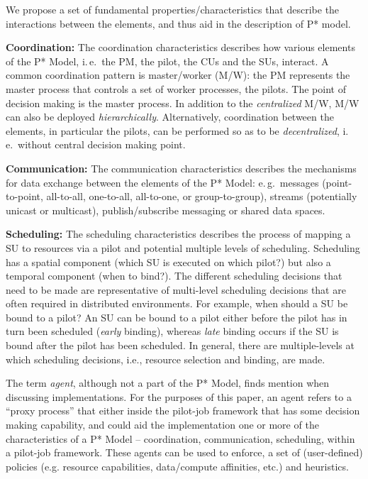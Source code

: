 \documentclass[conference,final]{IEEEtran}
\newcommand{\jhanote}[1]{ {\textcolor{red} { ***shantenu: #1 }}}
\newcommand{\alnote}[1]{ {\textcolor{blue} { ***andre: #1 }}}
\newcommand{\alnote}[1]{}
\newcommand{\jhanote}[1]{}
\newcommand{\cu}{CU}
\begin{document}
We propose a set of fundamental properties/characteristics that
describe the interactions between the elements, and thus aid in the
description of P* model.


\textbf{Coordination:} The coordination characteristics describes how
various elements of the P* Model, i.\,e.\ the PM, the pilot, the \cu s
and the SUs, interact. A common coordination pattern is master/worker
(M/W): the PM represents the master process that controls a set of
worker processes, the pilots. The point of decision making is the
master process. In addition to the \emph{centralized} M/W, M/W can
also be deployed \emph{hierarchically}.  Alternatively, coordination
between the elements, in particular the pilots, can be performed so as
to be \emph{decentralized}, i.\,e.\ without central decision making
point.

%

\textbf{Communication:} The communication characteristics describes the
mechanisms for data exchange between the elements of the P* Model:
e.\,g.\ messages (point-to-point, all-to-all, one-to-all, all-to-one,
or group-to-group), streams (potentially unicast or multicast),
publish/subscribe messaging or shared data spaces.
		
\textbf{Scheduling:} The scheduling characteristics describes the
process of mapping a SU to resources via a pilot and potential
multiple levels of scheduling. Scheduling has a spatial component
(which SU is executed on which pilot?) but also a temporal component
(when to bind?). The different scheduling decisions that need to be
made are representative of multi-level scheduling decisions that are
often required in distributed environments.  For example, when should
a SU be bound to a pilot?  An SU can be bound to a pilot either before
the pilot has in turn been scheduled ({\it early} binding), whereas
{\it late} binding occurs if the SU is bound after the pilot has been
scheduled.  In general, there are multiple-levels at which scheduling
decisions, i.e., resource selection and binding, are made.

The term {\it agent}, although not a part of the P* Model, finds
mention when discussing implementations. For the purposes of this
paper, an agent refers to a ``proxy process'' that either inside the
pilot-job framework that has some decision making capability, and
could aid the implementation one or more of the characteristics of a
P* Model -- coordination, communication, scheduling, within a
pilot-job framework.  These agents can be used to enforce, a set of
(user-defined) policies (e.g.  resource capabilities, data/compute
affinities, etc.) and heuristics.
\end{document}
